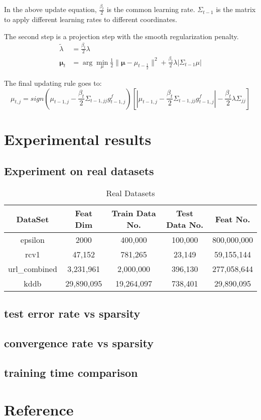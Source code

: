 \documentclass{article}
\begin{document}
In the above update equation, $\frac{\beta_t}{2}$ is the common learning rate.
$\Sigma_{t-1}$ is the matrix to apply different learning rates to different
coordinates.

The second step is a projection step with the smooth regularization penalty.
\begin{equation}
    \begin{aligned}
        \tilde{\lambda} &= \frac{\beta_t}{2} \lambda \\
        \bm{\mu}_{t} &= \arg\min_{\mu}{\frac{1}{2}\|\bm{\mu} -
        \mu_{t-\frac{1}{2}}\|^2
        + \frac{\beta_t}{2}\lambda|\Sigma_{t-1}\mu|}
    \end{aligned}
    \label{equ:08}
\end{equation}


The final updating rule goes to:
\begin{equation}
    \mu_{t,j} = sign(\mu_{t-1,j} -
    \frac{\beta_t}{2}\Sigma_{t-1,jj}g_{t-1,j}^f)
    [|\mu_{t-1,j} - \frac{\beta_t}{2}\Sigma_{t-1,jj}g_{t-1,j}^f| -
    \frac{\beta_t}{2}\lambda\Sigma_{jj}]
    \label{equ:09}
\end{equation}

\section{Experimental results}
\subsection{Experiment on real datasets}

\begin{table}[!ht]
\renewcommand{\arraystretch}{1.3}
\caption{Real Datasets}
\label{tbl:01}
\centering
\begin{tabular}{|c|c|c|c|c|}
\hline
DataSet& Feat Dim & Train Data No. & Test Data No. & Feat No.\\
\hline
epsilon & 2000 & 400,000 & 100,000 & 800,000,000 \\
\hline
rcv1& 47,152  & 781,265 & 23,149 &59,155,144\\
\hline
url\_combined & 3,231,961 & 2,000,000 & 396,130 &277,058,644\\
\hline
kddb & 29,890,095 &19,264,097 & 738,401 & 29,890,095\\
\hline
\end{tabular}
\end{table}


\subsection{test error rate vs sparsity}
\subsection{convergence rate vs sparsity}
\subsection{training time comparison}

\section{Reference}
\end{document}
